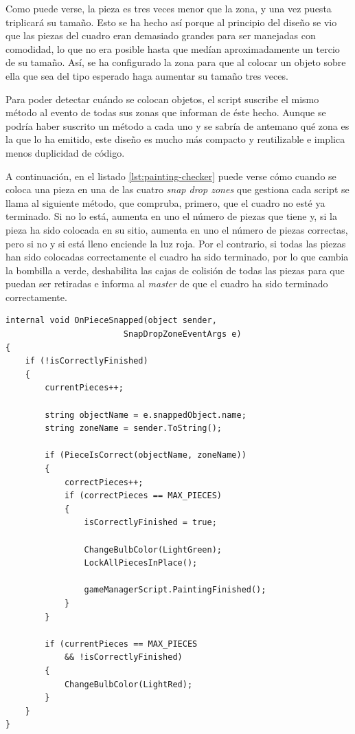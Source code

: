 Como puede verse, la pieza es tres veces menor que la zona, y una vez puesta triplicará su tamaño. Esto se ha hecho así porque al principio del diseño se vio que las piezas del cuadro eran demasiado grandes para ser manejadas con comodidad, lo que no era posible hasta que medían aproximadamente un tercio de su tamaño. Así, se ha configurado la zona para que al colocar un objeto sobre ella que sea del tipo esperado haga aumentar su tamaño tres veces.

Para poder detectar cuándo se colocan objetos, el script suscribe el mismo método al evento de todas sus zonas que informan de éste hecho. Aunque se podría haber suscrito un método a cada uno y se sabría de antemano qué zona es la que lo ha emitido, este diseño es mucho más compacto y reutilizable e implica menos duplicidad de código.

A continuación, en el listado \ref{lst:painting-checker} puede verse cómo cuando se coloca una pieza en una de las cuatro \textit{snap drop zones} que gestiona cada script se llama al siguiente método, que compruba, primero, que el cuadro no esté ya terminado. Si no lo está, aumenta en uno el número de piezas que tiene y, si la pieza ha sido colocada en su sitio, aumenta en uno el número de piezas correctas, pero si no y si está lleno enciende la luz roja. Por el contrario, si todas las piezas han sido colocadas correctamente el cuadro ha sido terminado, por lo que cambia la bombilla a verde, deshabilita las cajas de colisión de todas las piezas para que puedan ser retiradas e informa al \textit{master} de que el cuadro ha sido terminado correctamente.

\begin{lstlisting}[caption=Fragmento del script detectar piezas de cuadros, label=lst:painting-checker]
internal void OnPieceSnapped(object sender, 
                        SnapDropZoneEventArgs e)
{
    if (!isCorrectlyFinished)
    {
        currentPieces++;
    
        string objectName = e.snappedObject.name;
        string zoneName = sender.ToString();
    
        if (PieceIsCorrect(objectName, zoneName))
        {
            correctPieces++;
            if (correctPieces == MAX_PIECES)
            {
                isCorrectlyFinished = true;
    
                ChangeBulbColor(LightGreen);
                LockAllPiecesInPlace();
    
                gameManagerScript.PaintingFinished();
            }
        }
    
        if (currentPieces == MAX_PIECES 
            && !isCorrectlyFinished)
        {
            ChangeBulbColor(LightRed);
        }
    }
}
\end{lstlisting}


